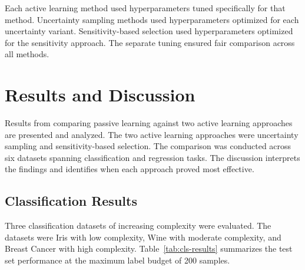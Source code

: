\documentclass[conference]{IEEEtran}
\begin{document}
Each active learning method used hyperparameters tuned specifically for that method. Uncertainty sampling methods used hyperparameters optimized for each uncertainty variant. Sensitivity-based selection used hyperparameters optimized for the sensitivity approach. The separate tuning ensured fair comparison across all methods.

\section{Results and Discussion}

Results from comparing passive learning against two active learning approaches are presented and analyzed. The two active learning approaches were uncertainty sampling and sensitivity-based selection. The comparison was conducted across six datasets spanning classification and regression tasks. The discussion interprets the findings and identifies when each approach proved most effective.

\subsection{Classification Results}

Three classification datasets of increasing complexity were evaluated. The datasets were Iris with low complexity, Wine with moderate complexity, and Breast Cancer with high complexity. Table~\ref{tab:cls-results} summarizes the test set performance at the maximum label budget of 200 samples.
\end{document}
